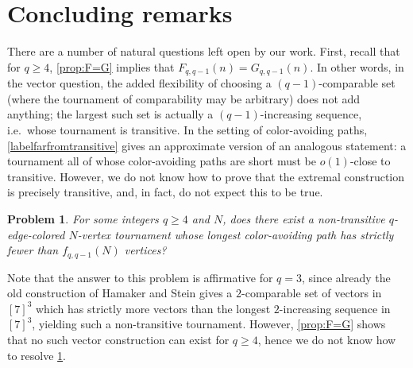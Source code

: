 \documentclass[11pt,reqno]{amsart}
\newtheorem{problem}[theorem]{Problem}
\theoremstyle{definition}
\newcommand\1{\mathbf{1}}
\let\geq\geqslant
\begin{document}
\section{Concluding remarks}\label{sec:conclusion}
There are a number of natural questions left open by our work. First, recall that for $q \geq 4$, \cref{prop:F=G} implies that $F_{q,q-1}(n)=G_{q,q-1}(n)$. In other words, in the vector question, the added flexibility of choosing a $(q-1)$-comparable set (where the tournament of comparability may be arbitrary) does not add anything; the largest such set is actually a $(q-1)$-increasing sequence, i.e.\ whose tournament is transitive. In the setting of color-avoiding paths, \cref{labelfarfromtransitive} gives an approximate version of an analogous statement: a tournament all of whose color-avoiding paths are short must be $o(1)$-close to transitive. However, we do not know how to prove that the extremal construction is precisely transitive, and, in fact, do not expect this to be true.
\begin{problem}\label{conj:transitive not extremal}
    For some integers $q \geq 4$ and $N$, does there exist a non-transitive $q$-edge-colored $N$-vertex tournament whose longest color-avoiding path has strictly fewer than $f_{q,q-1}(N)$ vertices?
\end{problem}
Note that the answer to this problem is affirmative for $q=3$, since already the old construction of Hamaker and Stein \cite{MR754867} gives a $2$-comparable set of vectors in $[7]^3$ which has strictly more vectors than the longest $2$-increasing sequence in $[7]^3$, yielding such a non-transitive tournament. However, \cref{prop:F=G} shows that no such vector construction can exist for $q \geq 4$, hence we do not know how to resolve \cref{conj:transitive not extremal}.
\end{document}
